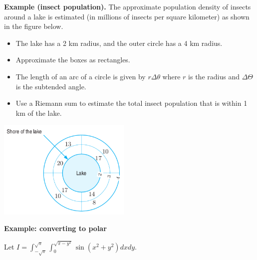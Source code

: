 \documentclass[12pt,letterpaper,noanswers]{exam}
\begin{document}
\noindent\textbf{Example (insect population).}  
The approximate population density of insects around a lake is estimated (in millions of insects per square kilometer) as shown in the figure below.  
\begin{itemize}
\itemsep0em
    \item The lake has a 2 km radius, and the outer circle has a 4 km radius.
\item Approximate the boxes as rectangles.  
\item The length of an arc of a circle is given by $r\Delta\theta$ where $r$ is the radius and $\Delta\Theta$ is the subtended angle.
\item Use a Riemann sum to estimate the total insect population that is within 1 km of the lake. 
\end{itemize}

 




\includegraphics[width=2.5in]{img/C19p2.png}



\vspace{1in}

\noindent\textbf{Example: converting to polar}

Let $I = \displaystyle\int_{-\sqrt{\pi}}^{\sqrt{\pi}}\int_0^{\sqrt{\pi-y^2}}\sin(x^2+y^2)dx dy$.
\end{document}
